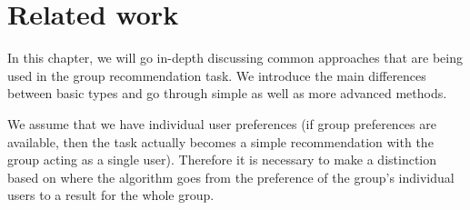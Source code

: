 \chapter{Related work} \label{chap:related_work}
In this chapter, we will go in-depth discussing common approaches that are being used in the group recommendation task. We introduce the main differences between basic types and go through simple as well as more advanced methods.\newline

We assume that we have individual user preferences (if group preferences are available, then the task actually becomes a simple recommendation with the group acting as a single user). Therefore it is necessary to make a distinction based on where the algorithm goes from the preference of the group's individual users to a result for the whole group.
